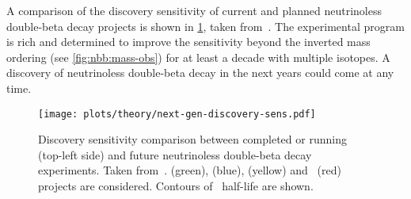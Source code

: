 A comparison of the discovery sensitivity of current and planned neutrinoless double-beta
decay projects is shown in \cref{fig:nbb:next-gen-disc-sens}, taken
from~\cite{Detwiler2020}. The experimental program is rich and determined to improve the
sensitivity beyond the inverted mass ordering (see \cref{fig:nbb:mass-obs}) for at least a
decade with multiple isotopes. A discovery of neutrinoless double-beta decay in the next
years could come at any time.

\begin{figure}
  \centering
  \texttt{[image: plots/theory/next-gen-discovery-sens.pdf]}
  \caption{%
    Discovery sensitivity comparison between completed or running (top-left side) and
    future neutrinoless double-beta decay experiments. Taken from~\cite{Detwiler2020}.
     (green),  (blue),  (yellow) and \gesix\ (red)
    projects are considered. Contours of \onbb\ half-life are shown.
  }\label{fig:nbb:next-gen-disc-sens}
\end{figure}

\chapendgliph{}

